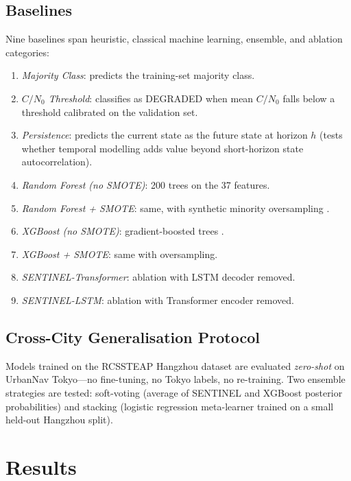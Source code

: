 \documentclass[pdflatex,sn-mathphys-num]{sn-jnl}
\begin{document}
\subsection{Baselines}

Nine baselines span heuristic, classical machine learning, ensemble, and
ablation categories:
\begin{enumerate}
  \item \textit{Majority Class}: predicts the training-set majority class.
  \item \textit{$C/N_0$ Threshold}: classifies as DEGRADED when mean
    $C/N_0$ falls below a threshold calibrated on the validation set.
  \item \textit{Persistence}: predicts the current state as the future
    state at horizon $h$ (tests whether temporal modelling adds value beyond
    short-horizon state autocorrelation).
  \item \textit{Random Forest (no SMOTE)}: 200 trees on the 37 features.
  \item \textit{Random Forest + SMOTE}: same, with synthetic minority
    oversampling \cite{[AuthorYear_SMOTE]}.
  \item \textit{XGBoost (no SMOTE)}: gradient-boosted trees
    \cite{[AuthorYear_XGBoost_Chen2016]}.
  \item \textit{XGBoost + SMOTE}: same with oversampling.
  \item \textit{SENTINEL-Transformer}: ablation with LSTM decoder removed.
  \item \textit{SENTINEL-LSTM}: ablation with Transformer encoder removed.
\end{enumerate}

\subsection{Cross-City Generalisation Protocol}

Models trained on the RCSSTEAP Hangzhou dataset are evaluated \emph{zero-shot}
on UrbanNav Tokyo---no fine-tuning, no Tokyo labels, no re-training.  Two
ensemble strategies are tested: soft-voting (average of SENTINEL and XGBoost
posterior probabilities) and stacking (logistic regression meta-learner
trained on a small held-out Hangzhou split).

\section{Results}\label{sec:results}
\end{document}
